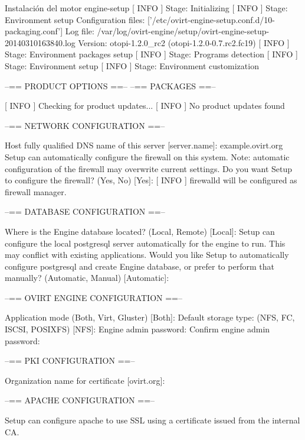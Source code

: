 \begin{TMterminal}{}{}{Instalación del motor}
  engine-setup
[ INFO  ] Stage: Initializing
   [ INFO  ] Stage: Environment setup
           Configuration files: ['/etc/ovirt-engine-setup.conf.d/10-packaging.conf']
           Log file: /var/log/ovirt-engine/setup/ovirt-engine-setup-20140310163840.log
           Version: otopi-1.2.0_rc2 (otopi-1.2.0-0.7.rc2.fc19)
   [ INFO  ] Stage: Environment packages setup
   [ INFO  ] Stage: Programs detection
   [ INFO  ] Stage: Environment setup
   [ INFO  ] Stage: Environment customization
          
           --== PRODUCT OPTIONS ==--
           --== PACKAGES ==--
          
   [ INFO  ] Checking for product updates...
   [ INFO  ] No product updates found
      
           --== NETWORK CONFIGURATION ==--
          
           Host fully qualified DNS name of this server [server.name]: example.ovirt.org
           Setup can automatically configure the firewall on this system.
           Note: automatic configuration of the firewall may overwrite current settings.
           Do you want Setup to configure the firewall? (Yes, No) [Yes]:
   [ INFO  ] firewalld will be configured as firewall manager.
          
           --== DATABASE CONFIGURATION ==--
          
           Where is the Engine database located? (Local, Remote) [Local]: 
           Setup can configure the local postgresql server automatically for the engine to run. This may conflict with existing applications.
           Would you like Setup to automatically configure postgresql and create Engine database, or prefer to perform that manually? (Automatic, Manual) [Automatic]: 
          
           --== OVIRT ENGINE CONFIGURATION ==--
          
           Application mode (Both, Virt, Gluster) [Both]: 
           Default storage type: (NFS, FC, ISCSI, POSIXFS) [NFS]: 
           Engine admin password: 
           Confirm engine admin password: 
          
           --== PKI CONFIGURATION ==--
          
           Organization name for certificate [ovirt.org]: 
          
           --== APACHE CONFIGURATION ==--
          
           Setup can configure apache to use SSL using a certificate issued from the internal CA.
     

\end{TMterminal}
